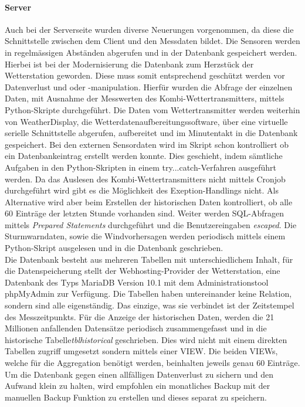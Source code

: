 \documentclass[10pt]{article}
\begin{document}
\begin{multicols}{2}
\paragraph{Server}
Auch bei der  Serverseite wurden diverse Neuerungen vorgenommen, da diese die Schnittstelle zwischen dem Client und den Messdaten bildet. Die Sensoren werden in regelmässigen Abständen abgerufen und in der Datenbank gespeichert werden. Hierbei ist bei der Modernisierung die Datenbank zum Herzstück der Wetterstation geworden. Diese muss somit entsprechend geschützt werden vor Datenverlust und oder -manipulation. Hierfür wurden die Abfrage der einzelnen Daten, mit Ausnahme der Messwerten des Kombi-Wettertransmitters, mittels Python-Skripte durchgeführt. Die Daten vom Wettertransmitter werden weiterhin von WeatherDisplay, die Wetterdatenaufbereitungssoftware, über eine virtuelle serielle Schnittstelle abgerufen, aufbereitet und im Minutentakt in die Datenbank gespeichert. Bei den externen Sensordaten wird im Skript schon kontrolliert ob ein Datenbankeintrag erstellt werden konnte. Dies geschieht, indem sämtliche Aufgaben in den Python-Skripten in einem try...catch-Verfahren ausgeführt werden. Da das Auslesen des Kombi-Wettertransmitters nicht mittels Cronjob durchgeführt wird gibt es die Möglichkeit des Exeption-Handlings nicht. Als Alternative wird aber beim Erstellen der historischen Daten kontrolliert, ob alle 60 Einträge der letzten Stunde vorhanden sind. Weiter werden SQL-Abfragen mittels \emph{Prepared Statements} durchgeführt und die Benutzereingaben \emph{escaped}. Die Sturmwarndaten, sowie die Windvorhersagen werden periodisch mittels einem Python-Skript ausgelesen und in die Datenbank geschrieben.\\
Die Datenbank besteht aus mehreren Tabellen mit unterschiedlichem Inhalt, für die Datenspeicherung stellt der Webhosting-Provider der Wetterstation, eine Datenbank des Typs MariaDB Version 10.1 mit dem Administrationstool phpMyAdmin zur Verfügung. Die Tabellen haben untereinander keine Relation, sondern sind alle eigenständig. Das einzige, was sie verbindet ist der Zeitstempel des Messzeitpunkts. Für die Anzeige der historischen Daten, werden die 21 Millionen anfallenden Datensätze periodisch zusammengefasst und in die  historische Tabelle\emph{tblhistorical} geschrieben. Dies wird nicht mit einem direkten Tabellen zugriff umgesetzt sondern mittels einer VIEW. Die beiden VIEWs, welche für die Aggregation benötigt werden, beinhalten jeweils genau 60 Einträge.\\
Um die Datenbank gegen einen allfälligen Datenverlust zu sichern und den Aufwand klein zu halten, wird empfohlen ein monatliches Backup mit der manuellen Backup Funktion zu erstellen und dieses separat zu speichern.

\end{multicols}
\end{document}
